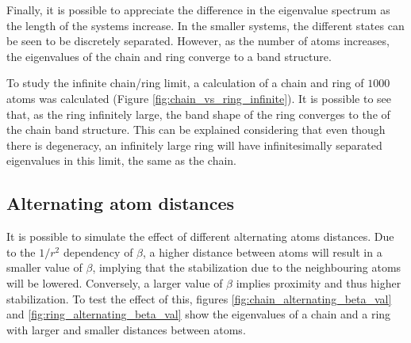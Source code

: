 \documentclass{article}
\begin{document}
Finally, it is possible to appreciate the difference in the eigenvalue spectrum as the length of the systems increase. In the smaller systems, the different states can be seen to be discretely separated. However, as the number of atoms increases, the eigenvalues of the chain and ring converge to a band structure. 

To study the infinite chain/ring limit, a calculation of a chain and ring of $1000$ atoms was calculated (Figure \ref{fig:chain_vs_ring_infinite}). It is possible to see that, as the ring infinitely large, the band shape of the ring converges to the of the chain band structure. This can be explained considering that even though there is degeneracy, an infinitely large ring will have infinitesimally separated eigenvalues in this limit, the same as the chain. 

\subsection{Alternating atom distances}
It is possible to simulate the effect of different alternating atoms distances. Due to the $1/r^2$ dependency of $\beta$, a higher distance between atoms will result in a smaller value of $\beta$, implying that the stabilization due to the neighbouring atoms will be lowered. Conversely, a larger value of $\beta$ implies proximity and thus higher stabilization. To test the effect of this, figures \ref{fig:chain_alternating_beta_val} and \ref{fig:ring_alternating_beta_val} show the eigenvalues of a chain and a ring with larger and smaller distances between atoms.
\end{document}

